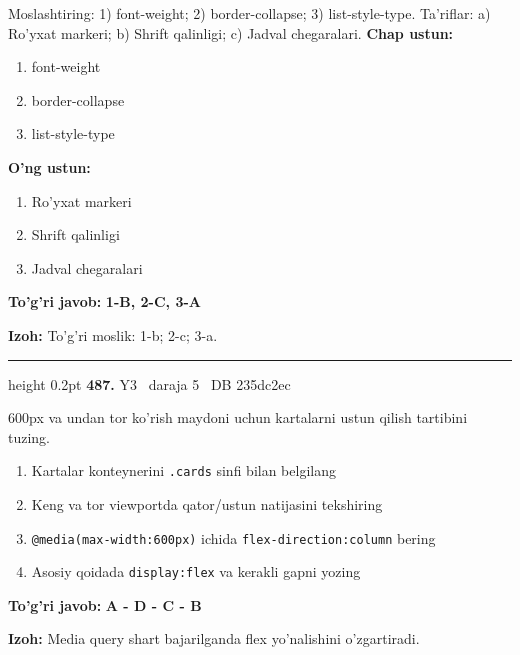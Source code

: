 \documentclass[10pt,a4paper,oneside]{article}
\begin{document}
\par
Moslashtiring: 1) font-weight; 2) border-collapse; 3) list-style-type. Ta'riflar: a) Ro'yxat markeri; b) Shrift qalinligi; c) Jadval chegaralari.
\textbf{\footnotesize Chap ustun:}
\begin{enumerate}[label=\arabic*),leftmargin=9mm]
\item font-weight
\item border-collapse
\item list-style-type
\end{enumerate}
\textbf{\footnotesize O'ng ustun:}
\begin{enumerate}[label=\Alph*),leftmargin=9mm]
\item Ro'yxat markeri
\item Shrift qalinligi
\item Jadval chegaralari
\end{enumerate}
\begin{tcolorbox}[enhanced,breakable,colback=teal!4,colframe=teal!45!black,boxrule=0.45pt,arc=1.2mm,left=2.8mm,right=2.8mm,top=2mm,bottom=2mm,before skip=2mm,after skip=2mm]
\textbf{\color{teal}To'g'ri javob:} \textbf{1-B, 2-C, 3-A}
\par\smallskip
\textbf{Izoh:} To'g'ri moslik: 1-b; 2-c; 3-a.
\end{tcolorbox}
\vspace{2mm}\hrule height 0.2pt \vspace{4mm}
\hypertarget{q487}{\textbf{\color{ink}487.}}  {\color{muted}\scriptsize Y3 \textbullet\ daraja 5 \textbullet\ DB 235dc2ec}
\par
600px va undan tor ko'rish maydoni uchun kartalarni ustun qilish tartibini tuzing.
\begin{enumerate}[label=\Alph*),leftmargin=9mm]
\item Kartalar konteynerini \texttt{.cards} sinfi bilan belgilang
\item Keng va tor viewportda qator/ustun natijasini tekshiring
\item \texttt{@media(max-width:600px)} ichida \texttt{flex-direction:column} bering
\item Asosiy qoidada \texttt{display:flex} va kerakli gapni yozing
\end{enumerate}
\begin{tcolorbox}[enhanced,breakable,colback=teal!4,colframe=teal!45!black,boxrule=0.45pt,arc=1.2mm,left=2.8mm,right=2.8mm,top=2mm,bottom=2mm,before skip=2mm,after skip=2mm]
\textbf{\color{teal}To'g'ri javob:} \textbf{A - D - C - B}
\par\smallskip
\textbf{Izoh:} Media query shart bajarilganda flex yo'nalishini o'zgartiradi.
\end{tcolorbox}
\end{document}
